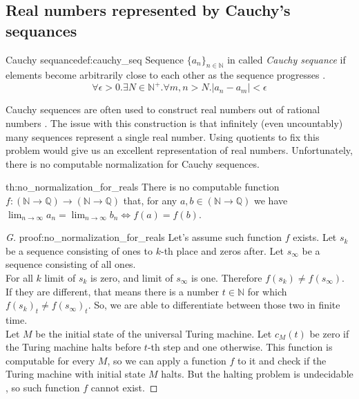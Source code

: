 \subsection{Real numbers represented by Cauchy's sequances}
\begin{defi}{Cauchy sequance}{def:cauchy_seq}
Sequence $\{a_n\}_{n\in \mathbb{N}}$ in called \emph{Cauchy sequance} if elements become arbitrarily close to each other as the sequence progresses \cite{Anal}.
$$
    \forall \epsilon > 0. \exists N \in \mathbb{N}^+. \forall m, n > N. |a_n - a_m| < \epsilon
$$
\end{defi}
Cauchy sequences are often used to construct real numbers out of rational numbers \cite{CauchyReals}. The issue with this construction is that infinitely (even uncountably) many sequences represent a single real number. Using quotients to fix this problem would give us an excellent representation of real numbers. Unfortunately, there is no computable normalization for Cauchy sequences.

\begin{theo}{}{th:no_normalization_for_reals}
There is no computable function $f: (\mathbb{N} \rightarrow \mathbb{Q}) \rightarrow (\mathbb{N} \rightarrow \mathbb{Q})$ that, for any $a, b \in (\mathbb{N} \rightarrow \mathbb{Q})$ we have $\lim_{n \rightarrow \infty}a_n = \lim_{n \rightarrow \infty}b_n \iff f(a) = f(b)$.
\end{theo}

\begin{proof}[G]{}{proof:no_normalization_for_reals}
Let's assume such function $f$ exists.
Let $s_k$ be a sequence consisting of ones to $k$-th place and zeros after. Let $s_\infty$ be a sequence consisting of all ones. \\For all $k$ limit of $s_k$ is zero, and limit of $s_\infty$ is one. Therefore $f(s_k) \not = f(s_\infty)$. If they are different, that means there is a number $t \in \mathbb{N}$ for which $f(s_k)_t \not = f(s_\infty)_t$. So, we are able to differentiate between those two in finite time.\\
Let $M$ be the initial state of the universal Turing machine. Let $c_M(t)$ be zero if the Turing machine halts before $t$-th step and one otherwise. This function is computable for every $M$, so we can apply a function $f$ to it and check if the Turing machine with initial state $M$ halts. But the halting problem is undecidable \cite{Undecidable}, so such function $f$ cannot exist. \contradiction
\end{proof}

